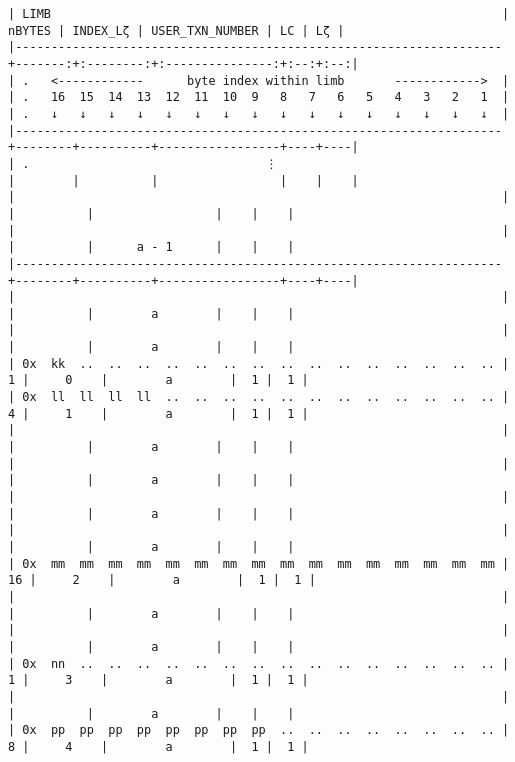 \documentclass[varwidth=\maxdimen,margin=0.5cm,multi={verbatim}]{standalone}
\begin{document}
\begin{verbatim}
| LIMB                                                               | nBYTES | INDEX_Lζ | USER_TXN_NUMBER | LC | Lζ |
|--------------------------------------------------------------------+-------:+:--------:+:---------------:+:--:+:--:|
| .   <------------      byte index within limb       ------------>  |
| .   16  15  14  13  12  11  10  9   8   7   6   5   4   3   2   1  |
| .   ↓   ↓   ↓   ↓   ↓   ↓   ↓   ↓   ↓   ↓   ↓   ↓   ↓   ↓   ↓   ↓  |
|--------------------------------------------------------------------+--------+----------+-----------------+----+----|
| .                                 ⋮                                |        |          |                 |    |    |
|                                                                    |        |          |                 |    |    |
|                                                                    |        |          |      a - 1      |    |    |
|--------------------------------------------------------------------+--------+----------+-----------------+----+----|
|                                                                    |        |          |        a        |    |    |
|                                                                    |        |          |        a        |    |    |
| 0x  kk  ..  ..  ..  ..  ..  ..  ..  ..  ..  ..  ..  ..  ..  ..  .. |      1 |     0    |        a        |  1 |  1 |
| 0x  ll  ll  ll  ll  ..  ..  ..  ..  ..  ..  ..  ..  ..  ..  ..  .. |      4 |     1    |        a        |  1 |  1 |
|                                                                    |        |          |        a        |    |    |
|                                                                    |        |          |        a        |    |    |
|                                                                    |        |          |        a        |    |    |
|                                                                    |        |          |        a        |    |    |
| 0x  mm  mm  mm  mm  mm  mm  mm  mm  mm  mm  mm  mm  mm  mm  mm  mm |     16 |     2    |        a        |  1 |  1 |
|                                                                    |        |          |        a        |    |    |
|                                                                    |        |          |        a        |    |    |
| 0x  nn  ..  ..  ..  ..  ..  ..  ..  ..  ..  ..  ..  ..  ..  ..  .. |      1 |     3    |        a        |  1 |  1 |
|                                                                    |        |          |        a        |    |    |
| 0x  pp  pp  pp  pp  pp  pp  pp  pp  ..  ..  ..  ..  ..  ..  ..  .. |      8 |     4    |        a        |  1 |  1 |

\end{verbatim}
\end{document}
